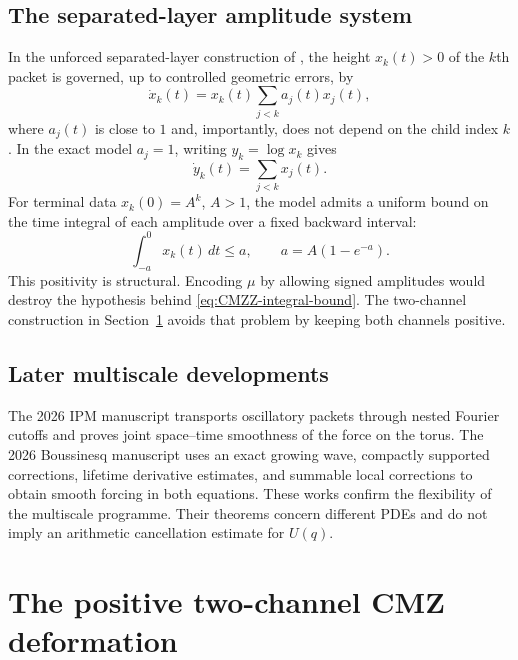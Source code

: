 \documentclass[11pt]{amsart}
\numberwithin{equation}{section}
\theoremstyle{plain}
\theoremstyle{definition}
\theoremstyle{remark}
\begin{document}
\subsection{The separated-layer amplitude system}
\label{subsec:CMZZ-ODE}

In the unforced separated-layer construction of
\cite{CordobaMartinezZoroaZheng2023}, the height $x_k(t)>0$ of the $k$th
packet is governed, up to controlled geometric errors, by
\begin{equation}
\dot x_k(t)=x_k(t)\sum_{j<k}a_j(t)x_j(t),
\label{eq:CMZZ-ODE}
\end{equation}
where $a_j(t)$ is close to $1$ and, importantly, does not depend on the child
index $k$.  In the exact model $a_j=1$, writing $y_k=\log x_k$ gives
\begin{equation}
\dot y_k(t)=\sum_{j<k}x_j(t).
\label{eq:CMZZ-log-law}
\end{equation}
For terminal data $x_k(0)=A^k$, $A>1$, the model admits a uniform bound on
the time integral of each amplitude over a fixed backward interval:
\begin{equation}
\int_{-a}^{0}x_k(t)\,dt\le a,
\qquad a=A(1-e^{-a}).
\label{eq:CMZZ-integral-bound}
\end{equation}
This positivity is structural.  Encoding $\mu$ by allowing signed amplitudes
would destroy the hypothesis behind \eqref{eq:CMZZ-integral-bound}.  The
two-channel construction in Section~\ref{sec:CMZ-deformation} avoids that
problem by keeping both channels positive.

\subsection{Later multiscale developments}
\label{subsec:later-multiscale}

The 2026 IPM manuscript \cite{AlpogeBuckmasterCoiculescu2026} transports
oscillatory packets through nested Fourier cutoffs and proves joint
space--time smoothness of the force on the torus.  The 2026 Boussinesq
manuscript \cite{AlpogeBuckmaster2026} uses an exact growing wave, compactly
supported corrections, lifetime derivative estimates, and summable local
corrections to obtain smooth forcing in both equations.  These works confirm
the flexibility of the multiscale programme.  Their theorems concern different
PDEs and do not imply an arithmetic cancellation estimate for $U(q)$.

\section{The positive two-channel CMZ deformation}
\label{sec:CMZ-deformation}
\end{document}
